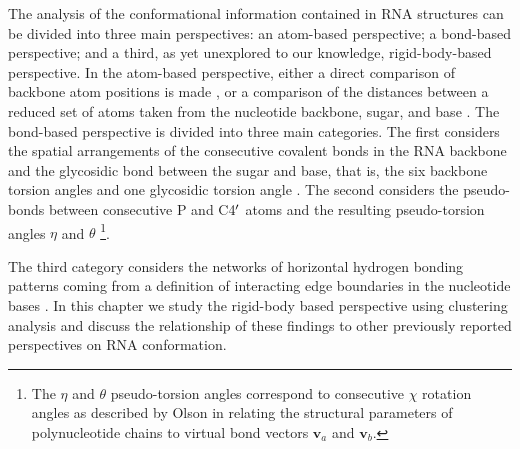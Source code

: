 \noindent The analysis of  the conformational information contained in
RNA  structures  can  be  divided  into three  main  perspectives:  an
atom-based perspective; a bond-based  perspective; and a third, as yet
unexplored  to our  knowledge, rigid-body-based  perspective.   In the
atom-based perspective,  either a  direct comparison of  backbone atom
positions  is  made  \cite{reijmers2001},   or  a  comparison  of  the
distances between  a reduced  set of atoms  taken from  the nucleotide
backbone,   sugar,   and   base  \cite{sykes2005}.    The   bond-based
perspective  is  divided  into   three  main  categories.   The  first
considers the  spatial arrangements of the  consecutive covalent bonds
in  the RNA backbone  and the  glycosidic bond  between the  sugar and
base,  that is,  the six  backbone torsion  angles and  one glycosidic
torsion   angle   \cite{reijmers2001,   murray2003,   hershkovitz2003,
  schneider2004,   hershkovitz2006}.    The   second   considers   the
pseudo-bonds  between consecutive P  and C4$^{\rm{\prime}}$  atoms and
the    resulting   pseudo-torsion    angles   $\eta$    and   $\theta$
\cite{olson1_1972,  duarte1998, duarte2003,  wadley2007} \footnote{The
  $\eta$ and $\theta$ pseudo-torsion angles correspond to consecutive
  $\chi$  rotation angles  as described  by Olson  \cite{olson1980} in
  relating  the  structural  parameters  of  polynucleotide  chains  to
  virtual bond vectors $\mathbf{v}_{a}$ and $\mathbf{v}_{b}$.}.

The  third  category considers  the  networks  of horizontal  hydrogen
bonding  patterns  coming  from   a  definition  of  interacting  edge
boundaries  in the  nucleotide  bases \cite{westhof2000,  leontis2002,
  leontis2006}.   In  this  chapter  we  study  the  rigid-body  based
perspective using clustering analysis  and discuss the relationship of
these  findings  to  other  previously reported  perspectives  on  RNA
conformation.

